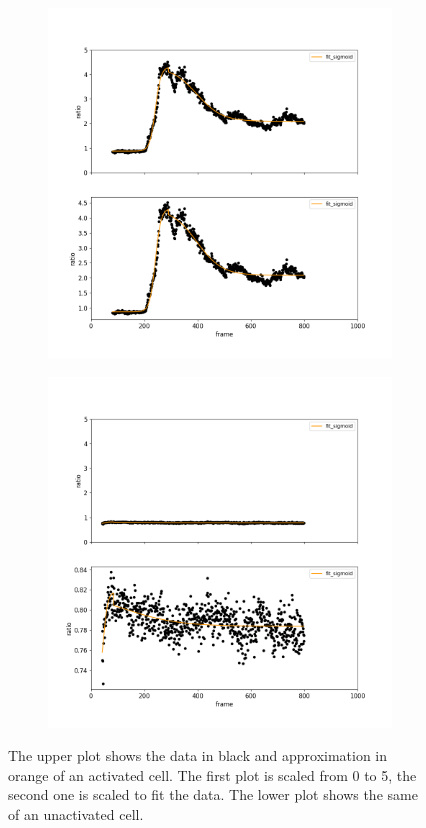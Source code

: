 \begin{figure}
	\centering
	\begin{subfigure}{0.69\linewidth}
		\includegraphics[width=\textwidth]{fig/particle_vis_sigmoid_approx_pos}
	\end{subfigure}
	\hfill
	\begin{subfigure}{0.69\linewidth}
		\includegraphics[width=\textwidth]{fig/particle_vis_sigmoid_approx_neg}
	\end{subfigure}
	
	\caption{The upper plot shows the data in black and approximation in orange of an activated cell. The first plot is scaled from 0 to 5, the second one is scaled to fit the data. The lower plot shows the same of an unactivated cell.}
	\label{fig:particle_vis_sigmoid_approx}
\end{figure}

